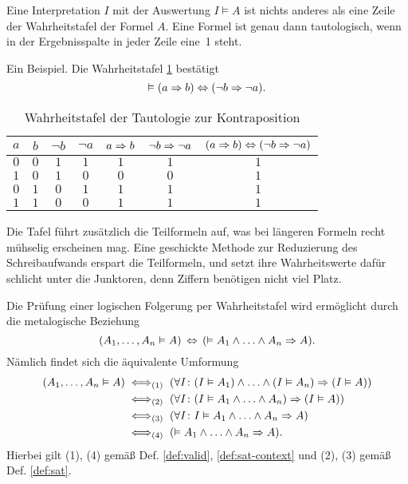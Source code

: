 Eine Interpretation $I$ mit der Auswertung $I\models A$ ist nichts
anderes als eine Zeile der Wahrheitstafel der
Formel $A$. Eine Formel ist genau dann tautologisch, wenn in der
Ergebnisspalte in jeder Zeile eine~1 steht.

Ein Beispiel. Die Wahrheitstafel \ref{tab:Tautologie-zur-Kontraposition}
bestätigt
\[\vDash (a\Rightarrow b)\Leftrightarrow (\lnot b\Rightarrow\lnot a).\]

\begin{table}
\caption{Wahrheitstafel der Tautologie zur Kontraposition}
\label{tab:Tautologie-zur-Kontraposition}
\centering
\begin{tabular}{cc@{\quad\;\;}c@{\quad\;\;}c@{\quad\;\;}c@{\quad\;\;}c@{\quad\;\;}c}
\toprule
$a$ & $b$ & $\lnot b$ & $\lnot a$ & $a\Rightarrow b$ & $\lnot b\Rightarrow\lnot a$
& $(a\Rightarrow b)\Leftrightarrow (\lnot b\Rightarrow\lnot a)$\\
\midrule[\heavyrulewidth]
$0$ & $0$ & $1$ & $1$ & $1$ & $1$ & $1$ \\
$1$ & $0$ & $1$ & $0$ & $0$ & $0$ & $1$ \\
$0$ & $1$ & $0$ & $1$ & $1$ & $1$ & $1$ \\
$1$ & $1$ & $0$ & $0$ & $1$ & $1$ & $1$ \\
\bottomrule
\end{tabular}
\end{table}

\noindent
Die Tafel führt zusätzlich die Teilformeln auf, was bei längeren
Formeln recht mühselig erscheinen mag. Eine geschickte Methode zur
Reduzierung des Schreibaufwands erspart die Teilformeln, und setzt ihre
Wahrheitswerte dafür schlicht unter die Junktoren, denn Ziffern
benötigen nicht viel Platz.

Die Prüfung einer logischen Folgerung per Wahrheitstafel
wird ermöglicht durch die metalogische Beziehung
\[(A_1,\ldots,A_n\vDash A)\,\Leftrightarrow\, (\vDash A_1\land\ldots\land A_n\Rightarrow A).\]
Nämlich findet sich die äquivalente Umformung
\begin{align*}
(A_1,\ldots,A_n\vDash A)
&\;\Longleftrightarrow_{\text{(1)}}\;
(\forall I\colon (I\vDash A_1)\land\ldots\land (I\vDash A_n)\Rightarrow (I\vDash A))\\
&\;\Longleftrightarrow_{\text{(2)}}\;
(\forall I\colon (I\vDash A_1\land\ldots\land A_n)\Rightarrow (I\vDash A))\\
&\;\Longleftrightarrow_{\text{(3)}}\;
(\forall I\colon I\vDash A_1\land\ldots\land A_n\Rightarrow A)\\
&\;\Longleftrightarrow_{\text{(4)}}\;
(\vDash A_1\land\ldots\land A_n\Rightarrow A).
\end{align*}
Hierbei gilt (1), (4) gemäß Def. \ref{def:valid}, \ref{def:sat-context}
und (2), (3) gemäß Def. \ref{def:sat}.


